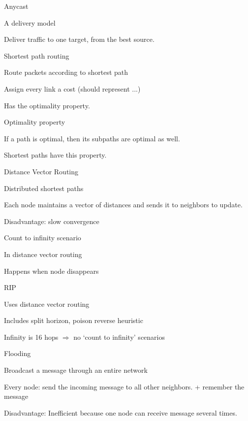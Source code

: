 \documentclass[main.tex]{subfiles}
\begin{document}
\begin{card}{Anycast}
\item A delivery model
\item Deliver traffic to one target, from the best source.
\end{card}


\begin{card}{Shortest path routing}
\item Route packets according to shortest path
\item Assign every link a cost (should represent ...)
\item Has the optimality property.
\end{card}

\begin{card}{Optimality property}
\item If a path is optimal, then its subpaths are optimal as well.
\item Shortest paths have this property.
\end{card}

\begin{card}{Distance Vector Routing}
\item Distributed shortest paths
\item Each node maintains a vector of distances and sends it to neighbors to update.
\item Disadvantage: slow convergence
\end{card}

\begin{card}{Count to infinity scenario}
\item In distance vector routing
\item Happens when node disappears
\end{card}

\begin{card}{RIP}
\item Uses distance vector routing
\item Includes split horizon, poison reverse heuristic
\item Infinity is 16 hops $\Rightarrow$ no `count to infinity' scenarios
\end{card}

\begin{card}{Flooding}
\item Broadcast a message through an entire network
\item Every node: send the incoming message to all other neighbors. + remember the message
\item Disadvantage: Inefficient because one node can receive message several times.
\end{card}
\end{document}
